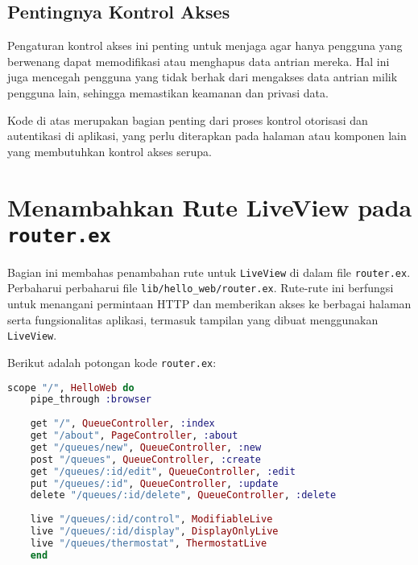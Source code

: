 \subsection{Pentingnya Kontrol Akses}
Pengaturan kontrol akses ini penting untuk menjaga agar hanya pengguna yang berwenang dapat memodifikasi atau menghapus data antrian mereka. Hal ini juga mencegah pengguna yang tidak berhak dari mengakses data antrian milik pengguna lain, sehingga memastikan keamanan dan privasi data.

Kode di atas merupakan bagian penting dari proses kontrol otorisasi dan autentikasi di aplikasi, yang perlu diterapkan pada halaman atau komponen lain yang membutuhkan kontrol akses serupa.

\section{Menambahkan Rute LiveView pada \texttt{router.ex}}

Bagian ini membahas penambahan rute untuk \texttt{LiveView} di dalam file \texttt{router.ex}. Perbaharui perbaharui file \texttt{lib/hello\_web/router.ex}. Rute-rute ini berfungsi untuk menangani permintaan HTTP dan memberikan akses ke berbagai halaman serta fungsionalitas aplikasi, termasuk tampilan yang dibuat menggunakan \texttt{LiveView}.

Berikut adalah potongan kode \texttt{router.ex}:

\begin{lstlisting}[language=Elixir]
	scope "/", HelloWeb do
	pipe_through :browser
	
	get "/", QueueController, :index
	get "/about", PageController, :about
	get "/queues/new", QueueController, :new
	post "/queues", QueueController, :create
	get "/queues/:id/edit", QueueController, :edit
	put "/queues/:id", QueueController, :update
	delete "/queues/:id/delete", QueueController, :delete
	
	live "/queues/:id/control", ModifiableLive
	live "/queues/:id/display", DisplayOnlyLive
	live "/queues/thermostat", ThermostatLive
	end
\end{lstlisting}

